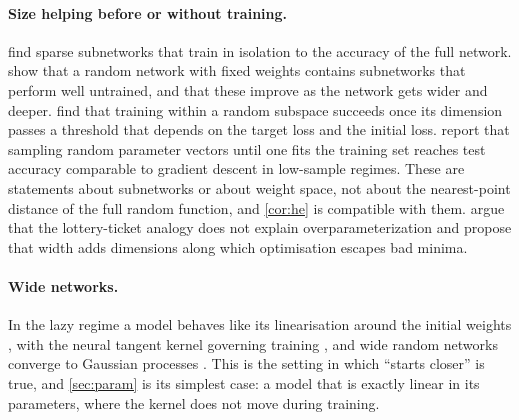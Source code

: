 \paragraph{Size helping before or without training.}
\citet{frankle2019lottery} find sparse subnetworks that train in isolation to
the accuracy of the full network. \citet{ramanujan2020hidden} show that a random
network with fixed weights contains subnetworks that perform well untrained,
and that these improve as the network gets wider and deeper.
\citet{larsen2022degrees} find that training within a random subspace succeeds
once its dimension passes a threshold that depends on the target loss and the
initial loss. \citet{chiang2023loss} report that sampling random parameter
vectors until one fits the training set reaches test accuracy comparable to
gradient descent in low-sample regimes. These are statements about subnetworks
or about weight space, not about the nearest-point distance of the full random
function, and \cref{cor:he} is compatible with them.
\citet{martinelli2026escape} argue that the lottery-ticket analogy does not
explain overparameterization and propose that width adds dimensions along which
optimisation escapes bad minima.

\paragraph{Wide networks.} In the lazy regime a model behaves like its
linearisation around the initial weights \citep{chizat2019lazy}, with the neural
tangent kernel governing training \citep{jacot2018ntk}, and wide random networks
converge to Gaussian processes \citep{matthews2018gaussian}. This is the setting
in which ``starts closer'' is true, and \cref{sec:param} is its simplest case:
a model that is exactly linear in its parameters, where the kernel does not
move during training.

